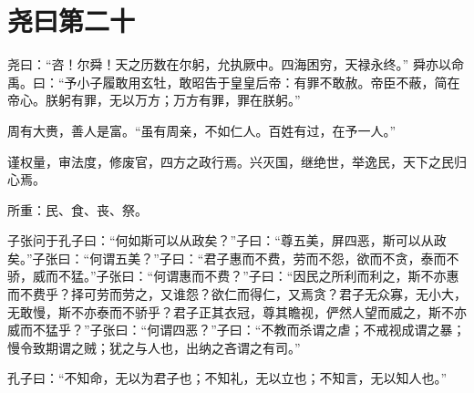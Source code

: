 \documentclass[twoside,openany]{book}
\begin{document}
\chapter{尧曰第二十}\label{ch20}



尧曰：“咨！尔舜！天之历数在尔躬，允执厥中。四海困穷，天禄永终。”
舜亦以命禹。曰：“予小子履敢用玄牡，敢昭告于皇皇后帝：有罪不敢赦。帝臣不蔽，简在帝心。朕躬有罪，无以万方；万方有罪，罪在朕躬。”

周有大赉，善人是富。“虽有周亲，不如仁人。百姓有过，在予一人。”

谨权量，审法度，修废官，四方之政行焉。兴灭国，继绝世，举逸民，天下之民归心焉。

所重：民、食、丧、祭。

子张问于孔子曰：“何如斯可以从政矣？”子曰：“尊五美，屏四恶，斯可以从政矣。”子张曰：“何谓五美？”子曰：“君子惠而不费，劳而不怨，欲而不贪，泰而不骄，威而不猛。”子张曰：“何谓惠而不费？”子曰：“因民之所利而利之，斯不亦惠而不费乎？择可劳而劳之，又谁怨？欲仁而得仁，又焉贪？君子无众寡，无小大，无敢慢，斯不亦泰而不骄乎？君子正其衣冠，尊其瞻视，俨然人望而威之，斯不亦威而不猛乎？”子张曰：“何谓四恶？”子曰：“不教而杀谓之虐；不戒视成谓之暴；慢令致期谓之贼；犹之与人也，出纳之吝谓之有司。”

孔子曰：“不知命，无以为君子也；不知礼，无以立也；不知言，无以知人也。”
\end{document}
